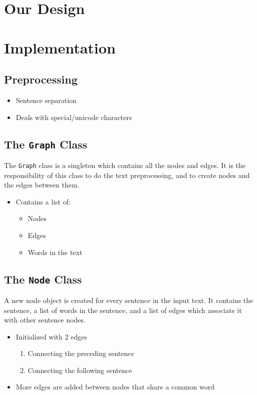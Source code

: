\documentclass[xcolor={usenames,dvipsnames,svgnames}]{beamer}
\begin{document}
\section{Our Design}

\section{Implementation}
\subsection{Preprocessing}
\begin{frame}
\begin{itemize}
	\item Sentence separation
	\item Deals with special/unicode characters
\end{itemize}
\end{frame}
\subsection{The {\tt Graph} Class}
\begin{frame}
The {\tt Graph} class is a singleton which contains all the nodes and edges. It is the responsibility of this class to do the text preprocessing, and to create nodes and the edges between them.
\begin{itemize}
	\item Contains a list of:
	\begin{itemize}
		\item Nodes
		\item Edges
		\item Words in the text
	\end{itemize}
\end{itemize}
\end{frame}
\subsection{The {\tt Node} Class}
\begin{frame}
A new node object is created for every sentence in the input text. It contains the sentence, a list of words in the sentence, and a list of edges which associate it with other sentence nodes.
\begin{itemize}
	\item Initialized with 2 edges
	\begin{enumerate}
		\item Connecting the preceding sentence
		\item Connecting the following sentence
	\end{enumerate}
	\item More edges are added between nodes that share a common word
\end{itemize}
\end{frame}
\end{document}
